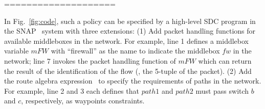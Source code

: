 ====================


In Fig.~\ref{fig:code}, such a policy can be specified by a high-level SDC program in the
SNAP~\cite{arashloo2016snap} system with three extensions: 
(1) Add packet handling functions for available
middleboxes in the network. For example, line 1 defines a middlebox variable
$mFW$ with ``firewall'' as the name to indicate the middlebox $fw$ in the
network; line 7 invokes the packet handling function of $mFW$ which can return
the result of the identification of the flow (\ie, the 5-tuple of the packet).
(2) Add the route algebra expression~\cite{gao2018t} to specify the requirements
of paths in the network. For example, line 2 and 3 each defines that $path1$ and
$path2$ must pass switch $b$  and $c$, respectively,  as waypoints constraints.





%

